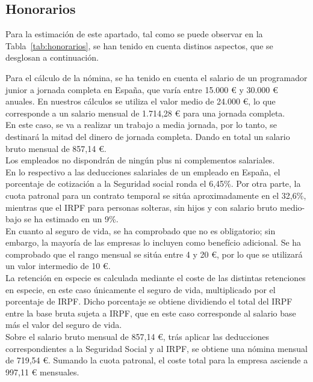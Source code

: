 \subsection{Honorarios}

Para la estimación de este apartado, tal como se puede observar en la Tabla~\ref{tab:honorarios}, se han tenido en cuenta distinos aspectos, que se desglosan a continuación.

Para el cálculo de la nómina, se ha tenido en cuenta el salario de un programador junior a jornada completa en España, que varía entre 15.000 € y 30.000 € anuales. En nuestros cálculos se utiliza el valor medio de 24.000 €, lo que corresponde a un salario mensual de 1.714,28 € para una jornada completa. \\

En este caso, se va a realizar un trabajo a media jornada, por lo tanto, se destinará la mitad del dinero de jornada completa. Dando en total un salario bruto mensual de 857,14 €. \\

Los empleados no dispondrán de ningún plus ni complementos salariales. \\

En lo respectivo a las deducciones salariales de un empleado en España, el porcentaje de cotización a la Seguridad social ronda el 6,45\%. Por otra parte, la cuota patronal para un contrato temporal se sitúa aproximadamente en el 32,6\%, mientras que el IRPF para personas solteras, sin hijos y con salario bruto medio-bajo se ha estimado en un 9\%. \\

En cuanto al seguro de vida, se ha comprobado que no es obligatorio; sin embargo, la mayoría de las empresas lo incluyen como benefício adicional. Se ha comprobado que el rango mensual se sitúa entre 4 y 20 €, por lo que se utilizará un valor intermedio de 10 €. \\

La retención en especie es calculada mediante el coste de las distintas retenciones en especie, en este caso únicamente el seguro de vida, multiplicado por el porcentaje de IRPF. Dicho porcentaje se obtiene dividiendo el total del IRPF entre la base bruta sujeta a IRPF, que en este caso corresponde al salario base más el valor del seguro de vida. \\

Sobre el salario bruto mensual de 857,14 €, trás aplicar las deducciones correspondientes a la Seguridad Social y al IRPF, se obtiene una nómina mensual de 719,54 €. Sumando la cuota patronal, el coste total para la empresa asciende a 997,11 € mensuales. \\

